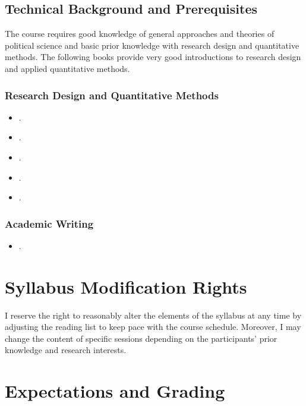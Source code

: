 \documentclass[abstract=on,parskip=full,headings=standardclasses,fontsize=11pt,paper=a4]{scrartcl}
\begin{document}
\subsection*{Technical Background and Prerequisites}

The course requires good knowledge of general approaches and theories of political science and basic prior knowledge with research design and quantitative methods. The following books provide very good introductions to research design and applied quantitative methods.

\subsubsection*{Research Design and Quantitative Methods}
\begin{itemize}
\item {}.
\item {}.
\item {}.
\item {}.
\item {}.
\end{itemize}

\subsubsection*{Academic Writing}
\begin{itemize}
\item {}.
\end{itemize}


\section*{Syllabus Modification Rights}

I reserve the right to reasonably alter the elements of the syllabus at any time by adjusting the reading list to keep pace with the course schedule. Moreover, I may change the content of specific sessions depending on the participants' prior knowledge and research interests.


\section*{Expectations and Grading}
\end{document}
